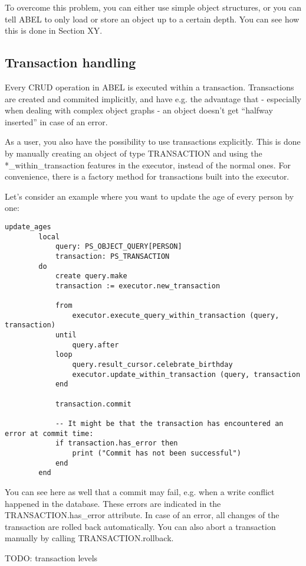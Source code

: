 To overcome this problem, you can either use simple object structures, or you can tell ABEL to only load or store an object up to a certain depth.
You can see how this is done in Section XY.

\subsection{Transaction handling}

Every CRUD operation in ABEL is executed within a transaction. 
Transactions are created and commited implicitly, and have e.g. the advantage that - especially when dealing with complex object graphs - an object doesn't get ``halfway inserted'' in case of an error.

As a user, you also have the possibility to use transactions explicitly. This is done by manually creating an object of type TRANSACTION and using the *\_within\_transaction features in the executor, instead of the normal ones.
For convenience, there is a factory method for transactions built into the executor.

Let's consider an example where you want to update the age of every person by one:

\begin{lstlisting}[language=OOSC2Eiffel, captionpos=b, caption={}, label={lst:update_all_ages}]
	update_ages
		local
			query: PS_OBJECT_QUERY[PERSON]
			transaction: PS_TRANSACTION
		do
			create query.make
			transaction := executor.new_transaction

			from
				executor.execute_query_within_transaction (query, transaction)
			until
				query.after
			loop
				query.result_cursor.celebrate_birthday
				executor.update_within_transaction (query, transaction
			end

			transaction.commit

			-- It might be that the transaction has encountered an error at commit time:
			if transaction.has_error then
				print ("Commit has not been successful")
			end
		end
\end{lstlisting}

You can see here as well that a commit may fail, e.g. when a write conflict happened in the database.
These errors are indicated in the TRANSACTION.has\_error attribute.
In case of an error, all changes of the transaction are rolled back automatically.
You can also abort a transaction manually by calling TRANSACTION.rollback. 


TODO: transaction levels

